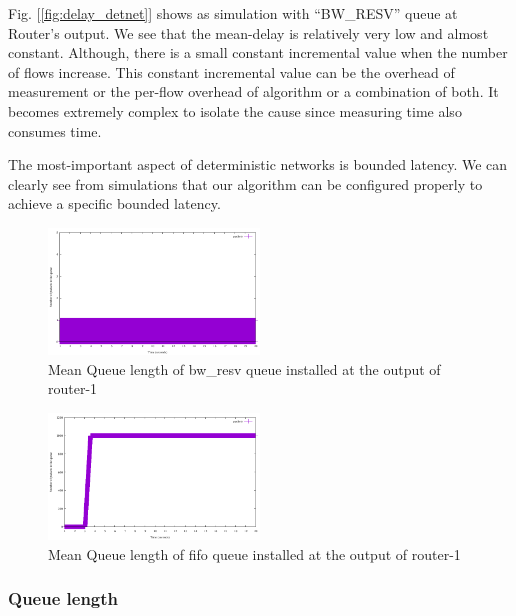 \documentclass[10pt,sigconf,letterpaper,anonymous]{acmart}
\begin{document}
Fig. [\ref{fig:delay_detnet}] shows as simulation with ``BW\_RESV'' queue at Router's output. We see that the mean-delay is relatively very low and almost constant. Although, there is a small constant incremental value when the number of flows increase. This constant incremental value can be the overhead of measurement or the per-flow overhead of algorithm or a combination of both. It becomes extremely complex to isolate the cause since measuring time also consumes time. 

The most-important aspect of deterministic networks is bounded latency. We can clearly see from simulations that our algorithm can be configured properly to achieve a specific bounded latency.

\begin{figure}[ht]
	\begin{center}
		\includegraphics[width=0.50\textwidth]{plots/pkt_detnet.pdf}
		\caption{Mean Queue length of bw\_resv queue installed at the output of router-1}\label{fig:pkt_detnet}
	\end{center}
\end{figure}
\begin{figure}[ht]
	\begin{center}
		\includegraphics[width=0.50\textwidth]{plots/pkt_fifo.pdf}
		\caption{Mean Queue length of fifo queue installed at the output of router-1}\label{fig:pkt_fifo}
	\end{center}
\end{figure}

\subsubsection{Queue length}
\end{document}
